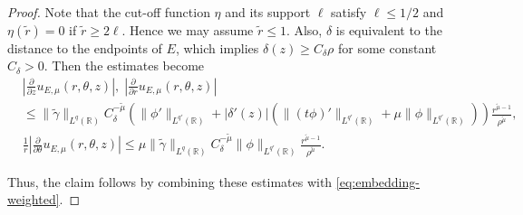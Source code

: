 \documentclass[10pt,a4paper]{amsart}
\newcommand{\R}{\mathbb{R}}
\renewcommand{\d}{\delta}
\newcommand{\g}{\gamma}
\newcommand{\p}{\partial}
\renewcommand{\t}{\theta}
\begin{document}
\begin{proof}
            Note that the cut-off function $\eta$ and its support $\ell$ satisfy $\ell \leq 1/2$ and $\eta(\widetilde{r})=0$ if $\widetilde{r}\geq 2\ell$. Hence we may assume $\widetilde{r}\leq 1$. Also, $\d$ is equivalent to the distance to the endpoints of $E$, which implies $\d(z)\geq C_{\d}\rho$ for some constant $C_\d>0$. Then the estimates become
            \begin{align*}
                &\left|\frac{\p}{\p z} u_{E,\mu}(r,\t,z)\right|,\; \left|\frac{\p}{\p r} u_{E,\mu}(r,\t,z)\right|\\
                 &\leq \|\widetilde{\g}\|_{L^q(\R)} C_\d^{-\widetilde{\mu}}\left( \|\phi'\|_{L^{q'}(\R)} + |\d'(z)|(\|(t\phi)'\|_{L^{q'}(\R)}+\mu \|\phi\|_{L^{q'}(\R)})\right)\frac{r^{\widetilde{\mu}-1}}{\rho^{\widetilde{\mu}}},\\
                 & \frac{1}{r} \left|\frac{\p}{\p \t} u_{E,\mu}(r,\t,z)\right| \leq \mu\|\widetilde{\g}\|_{L^q(\R)} C_\d^{-\widetilde{\mu}} \|\phi\|_{L^{q'}(\R)}\frac{r^{\widetilde{\mu}-1}}{\rho^{\widetilde{\mu}}}.
            \end{align*}            
            
            Thus, the claim follows by combining these estimates with \eqref{eq:embedding-weighted}.
        \end{proof}
\end{document}
